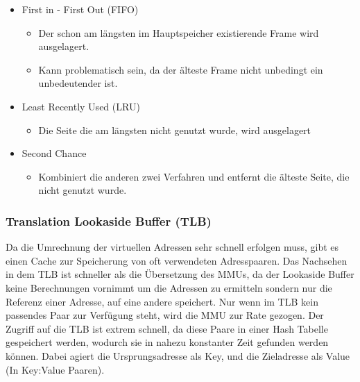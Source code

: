 \documentclass{article}
\begin{document}
	\begin{itemize}
		\item{First in - First Out (FIFO)}
		\begin{itemize}
			\item{Der schon am längsten im Hauptspeicher existierende Frame wird ausgelagert.}
			\item{Kann problematisch sein, da der älteste Frame nicht unbedingt ein unbedeutender ist.}
		\end{itemize}
		\item{Least Recently Used (LRU)}
		\begin{itemize}
			\item{Die Seite die am längsten nicht genutzt wurde, wird ausgelagert}
		\end{itemize}
		\item{Second Chance}
		\begin{itemize}
			\item{Kombiniert die anderen zwei Verfahren und entfernt die älteste Seite, die nicht genutzt wurde.}
		\end{itemize}
	\end{itemize}
	\subsubsection{Translation Lookaside Buffer (TLB)}
	Da die Umrechnung der virtuellen Adressen sehr schnell erfolgen muss, gibt es einen Cache zur Speicherung von oft verwendeten Adresspaaren. Das Nachsehen in dem TLB ist schneller als die Übersetzung des MMUs, da der Lookaside Buffer keine Berechnungen vornimmt um die Adressen zu ermitteln sondern nur die Referenz einer Adresse, auf eine andere speichert. Nur wenn im TLB kein passendes Paar zur Verfügung steht, wird die MMU zur Rate gezogen. Der Zugriff auf die TLB ist extrem schnell, da diese Paare in einer Hash Tabelle gespeichert werden, wodurch sie in nahezu konstanter Zeit gefunden werden können. Dabei agiert die Ursprungsadresse als Key, und die Zieladresse als Value (In Key:Value Paaren).


	
	
\end{document}

